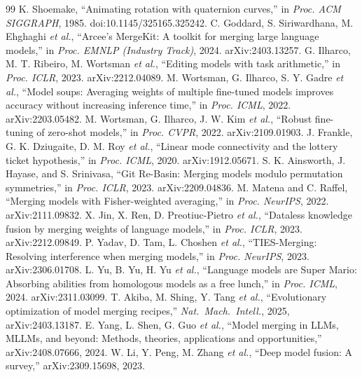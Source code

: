 \documentclass[conference]{IEEEtran}
\begin{document}
\begin{thebibliography}{99}
 K. Shoemake, ``Animating rotation with quaternion curves,'' in \emph{Proc. ACM SIGGRAPH}, 1985. doi:10.1145/325165.325242.
 C. Goddard, S. Siriwardhana, M. Ehghaghi \emph{et al.}, ``Arcee's MergeKit: A toolkit for merging large language models,'' in \emph{Proc. EMNLP (Industry Track)}, 2024. arXiv:2403.13257.
 G. Ilharco, M. T. Ribeiro, M. Wortsman \emph{et al.}, ``Editing models with task arithmetic,'' in \emph{Proc. ICLR}, 2023. arXiv:2212.04089.
 M. Wortsman, G. Ilharco, S. Y. Gadre \emph{et al.}, ``Model soups: Averaging weights of multiple fine-tuned models improves accuracy without increasing inference time,'' in \emph{Proc. ICML}, 2022. arXiv:2203.05482.
 M. Wortsman, G. Ilharco, J. W. Kim \emph{et al.}, ``Robust fine-tuning of zero-shot models,'' in \emph{Proc. CVPR}, 2022. arXiv:2109.01903.
 J. Frankle, G. K. Dziugaite, D. M. Roy \emph{et al.}, ``Linear mode connectivity and the lottery ticket hypothesis,'' in \emph{Proc. ICML}, 2020. arXiv:1912.05671.
 S. K. Ainsworth, J. Hayase, and S. Srinivasa, ``Git Re-Basin: Merging models modulo permutation symmetries,'' in \emph{Proc. ICLR}, 2023. arXiv:2209.04836.
 M. Matena and C. Raffel, ``Merging models with Fisher-weighted averaging,'' in \emph{Proc. NeurIPS}, 2022. arXiv:2111.09832.
 X. Jin, X. Ren, D. Preotiuc-Pietro \emph{et al.}, ``Dataless knowledge fusion by merging weights of language models,'' in \emph{Proc. ICLR}, 2023. arXiv:2212.09849.
 P. Yadav, D. Tam, L. Choshen \emph{et al.}, ``TIES-Merging: Resolving interference when merging models,'' in \emph{Proc. NeurIPS}, 2023. arXiv:2306.01708.
 L. Yu, B. Yu, H. Yu \emph{et al.}, ``Language models are Super Mario: Absorbing abilities from homologous models as a free lunch,'' in \emph{Proc. ICML}, 2024. arXiv:2311.03099.
 T. Akiba, M. Shing, Y. Tang \emph{et al.}, ``Evolutionary optimization of model merging recipes,'' \emph{Nat.\ Mach.\ Intell.}, 2025, arXiv:2403.13187.
 E. Yang, L. Shen, G. Guo \emph{et al.}, ``Model merging in LLMs, MLLMs, and beyond: Methods, theories, applications and opportunities,'' arXiv:2408.07666, 2024.
 W. Li, Y. Peng, M. Zhang \emph{et al.}, ``Deep model fusion: A survey,'' arXiv:2309.15698, 2023.

\end{thebibliography}
\end{document}
